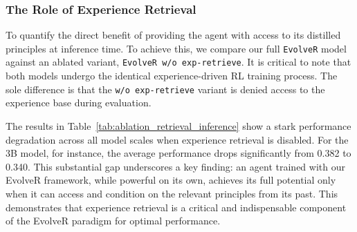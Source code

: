 \subsubsection{The Role of Experience Retrieval}
To quantify the direct benefit of providing the agent with access to its distilled principles at inference time. To achieve this, we compare our full \texttt{EvolveR} model against an ablated variant, \texttt{EvolveR w/o exp-retrieve}. It is critical to note that both models undergo the identical experience-driven RL training process. The sole difference is that the \texttt{w/o exp-retrieve} variant is denied access to the experience base during evaluation.

The results in Table~\ref{tab:ablation_retrieval_inference} show a stark performance degradation across all model scales when experience retrieval is disabled. For the 3B model, for instance, the average performance drops significantly from 0.382 to 0.340. This substantial gap underscores a key finding: an agent trained with our EvolveR framework, while powerful on its own, achieves its full potential only when it can access and condition on the relevant principles from its past. This demonstrates that experience retrieval is a critical and indispensable component of the EvolveR paradigm for optimal performance.

